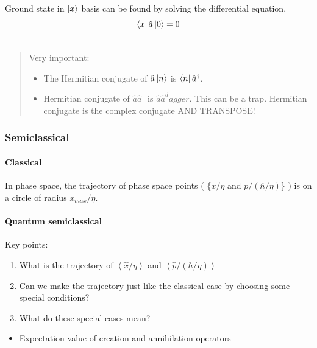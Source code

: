 \documentclass[letterpaper,10pt,english]{sphinxmanual}
\begin{document}
Ground state in ${\ket{x}}$ basis can be found by solving the differential equation,
\begin{gather}
\begin{split}\bra{x} \hat a \ket{0} = 0\end{split}\notag\\\begin{split}\end{split}\notag
\end{gather}\begin{quote}

Very important:
\begin{itemize}
\item {} 
The Hermitian conjugate of $\hat a \ket{n}$ is $\bra{n} \hat a^\dagger$.

\item {} 
Hermitian conjugate of $\hat a \hat a^\dagger$ is $\hat a \hat a^dagger$. This can be a trap. Hermitian conjugate is the complex conjugate AND TRANSPOSE!

\end{itemize}
\end{quote}


\subsubsection{Semiclassical}
\label{QuantumMechanics:semiclassical}

\paragraph{Classical}
\label{QuantumMechanics:classical}
In phase space, the trajectory of phase space points ( \{$x/\eta$ and $p/(\hbar/\eta)$\} ) is on a circle of radius $x_{max}/\eta$.


\paragraph{Quantum semiclassical}
\label{QuantumMechanics:quantum-semiclassical}
Key points:
\begin{enumerate}
\item {} 
What is the trajectory of $\left<\hat x/\eta\right>$ and $\left<\hat p/(\hbar/\eta)\right>$

\item {} 
Can we make the trajectory just like the classical case by choosing some special conditions?

\item {} 
What do these special cases mean?

\end{enumerate}
\begin{itemize}
\item {} 
Expectation value of creation and annihilation operators

\end{itemize}
\end{document}
